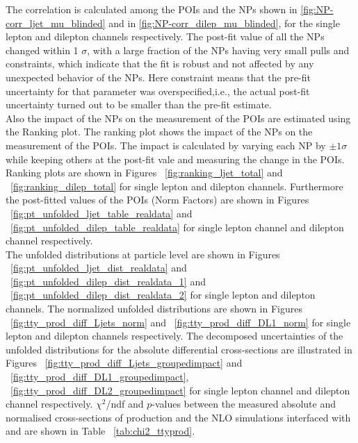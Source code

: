 The correlation is calculated among the POIs and the NPs shown in \cref{fig:NP-corr_ljet_mu_blinded} and in \cref{fig:NP-corr_dilep_mu_blinded}, for the single lepton and dilepton channels respectively. The post-fit value of all the NPs changed within 1 $\sigma$, with a large fraction of the NPs having very small pulls and constraints, which indicate that the fit is robust and not affected by any unexpected behavior of the NPs. Here constraint means that the pre-fit uncertainty for that parameter was overspecified,i.e., the actual post-fit uncertainty turned out to be smaller than the pre-fit estimate. \\

Also the impact of the NPs on the measurement of the POIs are estimated using the Ranking plot. 
The ranking plot shows the impact of the NPs on the measurement of the POIs. The impact is calculated by varying each NP by $\pm 1 \sigma$ while keeping others at the post-fit vale and measuring the change in the POIs. Ranking plots are shown in Figures ~\ref{fig:ranking_ljet_total} and ~\ref{fig:ranking_dilep_total} for single lepton and dilepton channels. Furthermore the post-fitted values of the POIs (Norm Factors) are shown in Figures ~\ref{fig:pt_unfolded_ljet_table_realdata} and ~\ref{fig:pt_unfolded_dilep_table_realdata} for single lepton channel and dilepton channel respectively.  \\

The unfolded distributions at particle level are shown in Figures ~\ref{fig:pt_unfolded_ljet_dist_realdata} and ~\ref{fig:pt_unfolded_dilep_dist_realdata_1} and ~\ref{fig:pt_unfolded_dilep_dist_realdata_2} for single lepton and dilepton channels. The normalized unfolded distributions are shown in Figures ~\ref{fig:tty_prod_diff_Ljets_norm} and ~\ref{fig:tty_prod_diff_DL1_norm} for single lepton and dilepton channels respectively. The decomposed uncertainties of the unfolded distributions for the absolute differential cross-sections are illustrated in Figures ~\ref{fig:tty_prod_diff_Ljets_groupedimpact} and ~\ref{fig:tty_prod_diff_DL1_groupedimpact}, ~\ref{fig:tty_prod_diff_DL2_groupedimpact} for single lepton channel and dilepton channel respectively. $\chi^2$/ndf and $p$-values between the measured absolute and normalised cross-sections of \tty production and the NLO \MGNLO simulations interfaced with \PYTHIA[8] and \HERWIG[7] are shown in Table ~\ref{tab:chi2_ttyprod}.





